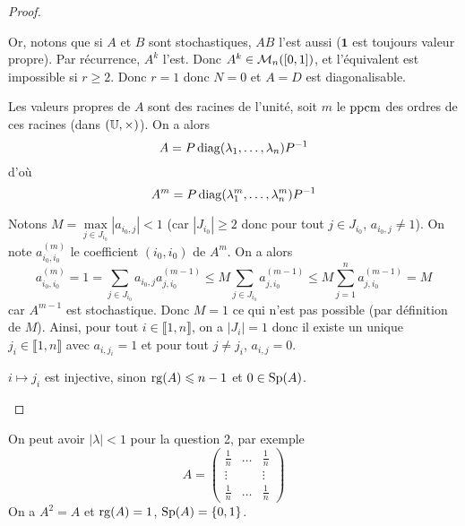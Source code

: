 \documentclass[12pt]{article}
\begin{document}
\begin{proof}
\begin{enumerate}
		Or, notons que si $A$ et $B$ sont stochastiques, $AB$ l'est aussi ($\bm{1}$ est toujours valeur propre). Par récurrence, $A^{k}$ l'est. Donc $A^{k}\in\mathcal{M}_{n}([0,1])$, et l'équivalent est impossible si $r\geqslant2$. Donc $r=1$ donc $N=0$ et $A=D$ est diagonalisable.

		Les valeurs propres de $A$ sont des racines de l'unité, soit $m$ le $\operatorname{ppcm}$ des ordres de ces racines (dans $(\mathbb{U},\times)$). On a alors 
		\begin{equation}
			A=P\operatorname{diag}(\lambda_{1},\dots,\lambda_{n})P^{-1}
		\end{equation}
		d'où 
		\begin{equation}
			A^{m}=P\operatorname{diag}(\lambda_{1}^{m},\dots,\lambda_{n}^{m})P^{-1}
		\end{equation}

		Notons $M=\max\limits_{j\in J_{i_{0}}}\left\lvert a_{i_{0},j}\right\rvert<1$ (car $\left\lvert J_{i_{0}}\right\rvert\geqslant2$ donc pour tout $j\in J_{i_{0}}$, $a_{i_{0},j}\neq1$). On note $a_{i_{0},i_{0}}^{(m)}$ le coefficient $(i_{0},i_{0})$ de $A^{m}$. On a alors 
		\begin{equation}
			a_{i_{0},i_{0}}^{(m)}=1=\sum_{j\in J_{i_{0}}}a_{i_{0},j}a_{j,i_{0}}^{(m-1)}\leqslant M\sum_{j\in J_{i_{0}}}a_{j,i_{0}}^{(m-1)}\leqslant M\sum_{j=1}^{n}a_{j,i_{0}}^{(m-1)}=M
		\end{equation}
		car $A^{m-1}$ est stochastique. Donc $M=1$ ce qui n'est pas possible (par définition de $M$). Ainsi, pour tout $i\in\llbracket1,n\rrbracket$, on a $\lvert J_{i}\rvert=1$ donc il existe un unique $j_{i}\in\llbracket1,n\rrbracket$ avec $a_{i,j_{i}}=1$ et pour tout $j\neq j_{i}$, $a_{i,j}=0$.

		$i\mapsto j_{i}$ est injective, sinon $\operatorname{rg}(A)\leqslant n-1$ et $0\in\operatorname{Sp}(A)$.
	\end{enumerate}
\end{proof}

\begin{remark}
	On peut avoir $\left\lvert \lambda\right\rvert<1$ pour la question 2, par exemple 
	\begin{equation}
		A=
		\begin{pmatrix}
			\frac{1}{n}&\dots&\frac{1}{n}\\
			\vdots&&\vdots\\
			\frac{1}{n}&\dots&\frac{1}{n}
		\end{pmatrix}
	\end{equation}
	On a $A^{2}=A$ et $\operatorname{rg}(A)=1$, $\operatorname{Sp}(A)=\lbrace0,1\rbrace$.
\end{remark}
\end{document}
